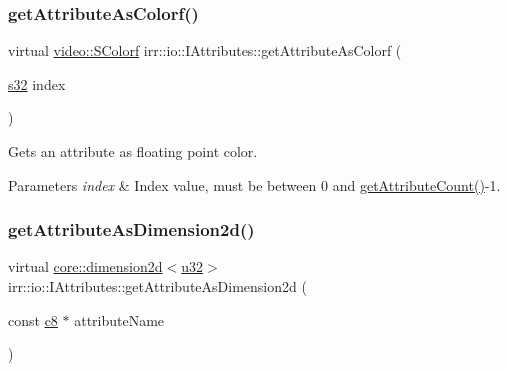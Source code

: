 \subsubsection{\texorpdfstring{get\+Attribute\+As\+Colorf()}{getAttributeAsColorf()}\hspace{0.1cm}{\footnotesize\ttfamily [4/4]}}
{\footnotesize\ttfamily virtual \hyperlink{classirr_1_1video_1_1SColorf}{video\+::\+S\+Colorf} irr\+::io\+::\+I\+Attributes\+::get\+Attribute\+As\+Colorf (\begin{DoxyParamCaption}\item[{\hyperlink{namespaceirr_ac66849b7a6ed16e30ebede579f9b47c6}{s32}}]{index }\end{DoxyParamCaption})\hspace{0.3cm}{\ttfamily [pure virtual]}}



Gets an attribute as floating point color. 


\begin{DoxyParams}{Parameters}
{\em index} & Index value, must be between 0 and \hyperlink{classirr_1_1io_1_1IAttributes_a796bdd9440ee7ba0b6742a90a82870b6}{get\+Attribute\+Count()}-\/1. \\
\hline
\end{DoxyParams}
\mbox{\label{classirr_1_1io_1_1IAttributes_a150afece0c99c98668a8f21247f2396f}} 
\subsubsection{\texorpdfstring{get\+Attribute\+As\+Dimension2d()}{getAttributeAsDimension2d()}\hspace{0.1cm}{\footnotesize\ttfamily [1/4]}}
{\footnotesize\ttfamily virtual \hyperlink{classirr_1_1core_1_1dimension2d}{core\+::dimension2d}$<$\hyperlink{namespaceirr_a0416a53257075833e7002efd0a18e804}{u32}$>$ irr\+::io\+::\+I\+Attributes\+::get\+Attribute\+As\+Dimension2d (\begin{DoxyParamCaption}\item[{const \hyperlink{namespaceirr_a9395eaea339bcb546b319e9c96bf7410}{c8} $\ast$}]{attribute\+Name }\end{DoxyParamCaption})\hspace{0.3cm}{\ttfamily [pure virtual]}}



